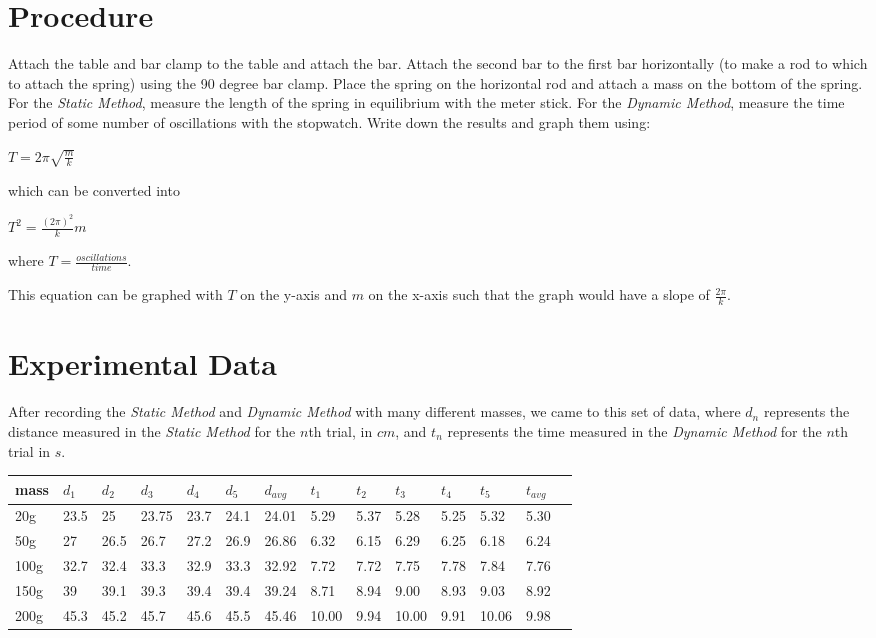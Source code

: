 \documentclass{article}
\begin{document}
\section{Procedure}
Attach the table and bar clamp to the table and attach the bar. Attach the second bar to the first bar horizontally (to make a rod to which to attach the spring) using the 90 degree bar clamp. Place the spring on the horizontal rod and attach a mass on the bottom of the spring. For the \emph{Static Method}, measure the length of the spring in equilibrium with the meter stick. For the \emph{Dynamic Method}, measure the time period of some number of oscillations with the stopwatch. Write down the results and graph them using:

\begin{center}$T=2\pi\sqrt{\frac{m}{k}}$\end{center}

	which can be converted into
	
\begin{center}$T^{2}=\frac{(2\pi)^{2}}{k}m$\end{center}

where $T=\frac{oscillations}{time}$.

This equation can be graphed with $T$ on the y-axis and $m$ on the x-axis such that the graph would have a slope of $\frac{2\pi}{k}$.

\section{Experimental Data}
After recording the \emph{Static Method} and \emph{Dynamic Method} with
	many different masses, we came to this set of data, where $d_{n}$ represents the distance measured in the \emph{Static Method} for the $n$th trial, in $cm$, and $t_{n}$ represents the time measured in the \emph{Dynamic Method} for the $n$th trial in $s$.

\begin{center}
\begin{table}[h]
\begin{tabular}{|l|l|l|l|l|l|l|l|l|l|l|l|l|l|}
\hline
mass & $d_1$ & $d_2$ & $d_3$ & $d_4$ & $d_5$ & $d_{avg}$ & $t_1$ & $t_2$ & $t_3$ & $t_4$ & $t_5$ & $t_{avg}$ \\ \hline 
20g & 23.5 & 25 & 23.75 & 23.7 & 24.1 & 24.01 & 5.29 & 5.37 & 5.28 & 5.25 & 5.32 & 5.30 \\ \hline
50g & 27 & 26.5 & 26.7 & 27.2 & 26.9 & 26.86 & 6.32 & 6.15 & 6.29 & 6.25 & 6.18 & 6.24 \\ \hline
100g & 32.7 & 32.4 & 33.3 & 32.9 & 33.3 & 32.92 & 7.72 & 7.72 & 7.75 & 7.78 & 7.84 & 7.76 \\ \hline
150g & 39 & 39.1 & 39.3 & 39.4 & 39.4 & 39.24 & 8.71 & 8.94 & 9.00 & 8.93 & 9.03 & 8.92 \\ \hline
200g & 45.3 & 45.2 & 45.7 & 45.6 & 45.5 & 45.46 & 10.00 & 9.94 & 10.00 & 9.91 & 10.06 & 9.98 \\ \hline

\end{tabular}
\end{table}
\end{center}
\end{document}

